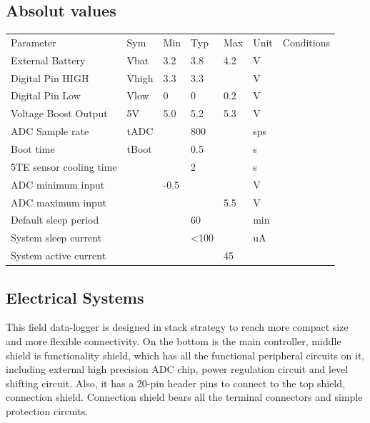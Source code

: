   \subsection{Absolut values}
    \label{absValue}
\begin{table}[H]
\centering
\begin{tabular}{|l|l|l|l|l|l|l|}
Parameter               & Sym   & Min  & Typ          & Max & Unit & Conditions \\
External Battery        & Vbat  & 3.2  & 3.8          & 4.2 & V    &            \\
Digital Pin HIGH        & Vhigh & 3.3  & 3.3          &     & V    &            \\
Digital Pin Low         & Vlow  & 0    & 0            & 0.2 & V    &            \\
Voltage Boost Output    & 5V    & 5.0  & 5.2          & 5.3 & V    &            \\
ADC Sample rate         & tADC  &      & 800          &     & sps  &            \\
Boot time               & tBoot &      & 0.5          &     & s    &            \\
5TE sensor cooling time &       &      & 2            &     & s    &            \\
ADC minimum input       &       & -0.5 &              &     & V    &            \\
ADC maximum input       &       &      &              & 5.5 & V    &            \\
Default sleep period    &       &      & 60           &     & min  &            \\
System sleep current    &       &      & \textless100 &     & uA   &            \\
System active current   &       &      &              & 45  &      &           
\end{tabular}
\end{table}





  \subsection{Electrical Systems}
  This field data-logger is designed in stack strategy to reach more compact size and more flexible connectivity. On the bottom is the main controller, middle shield is functionality shield, which has all the functional peripheral circuits on it, including external high precision ADC chip, power regulation circuit and level shifting circuit. Also, it has a 20-pin header pins to connect to the top shield, connection shield. Connection shield bears all the terminal connectors and simple protection circuits.

